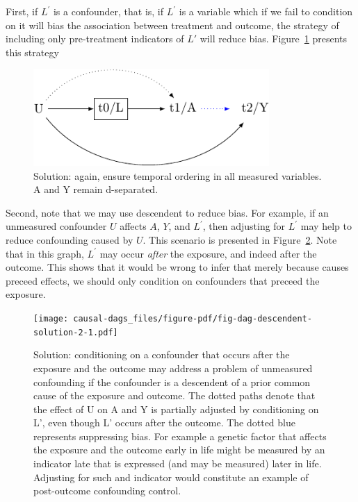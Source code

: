 \documentclass[
  singlecolumn]{report}
\begin{document}
First, if \(L^\prime\) is a confounder, that is, if \(L^\prime\) is a
variable which if we fail to condition on it will bias the association
between treatment and outcome, the strategy of including only
pre-treatment indicators of \(L\prime\) will reduce bias.
Figure~\ref{fig-dag-descendent-solution} presents this strategy

\begin{figure}

{\centering \includegraphics[width=0.8\textwidth,height=\textheight]{causal-dags_files/figure-pdf/fig-dag-descendent-solution-1.pdf}

}

\caption{\label{fig-dag-descendent-solution}Solution: again, ensure
temporal ordering in all measured variables. A and Y remain
d-separated.}

\end{figure}

Second, note that we may use descendent to reduce bias. For example, if
an unmeasured confounder \(U\) affects \(A\), \(Y\), and \(L^\prime\),
then adjusting for \(L^\prime\) may help to reduce confounding caused by
\(U\). This scenario is presented in
Figure~\ref{fig-dag-descendent-solution-2}. Note that in this graph,
\(L^\prime\) may occur \emph{after} the exposure, and indeed after the
outcome. This shows that it would be wrong to infer that merely because
causes preceed effects, we should only condition on confounders that
preceed the exposure.

\begin{figure}

{\centering \texttt{[image: causal-dags\_files/figure-pdf/fig-dag-descendent-solution-2-1.pdf]}

}

\caption{\label{fig-dag-descendent-solution-2}Solution: conditioning on
a confounder that occurs after the exposure and the outcome may address
a problem of unmeasured confounding if the confounder is a descendent of
a prior common cause of the exposure and outcome. The dotted paths
denote that the effect of U on A and Y is partially adjusted by
conditioning on L', even though L' occurs after the outcome. The dotted
blue represents suppressing bias. For example a genetic factor that
affects the exposure and the outcome early in life might be measured by
an indicator late that is expressed (and may be measured) later in life.
Adjusting for such and indicator would constitute an example of
post-outcome confounding control.}

\end{figure}
\end{document}
